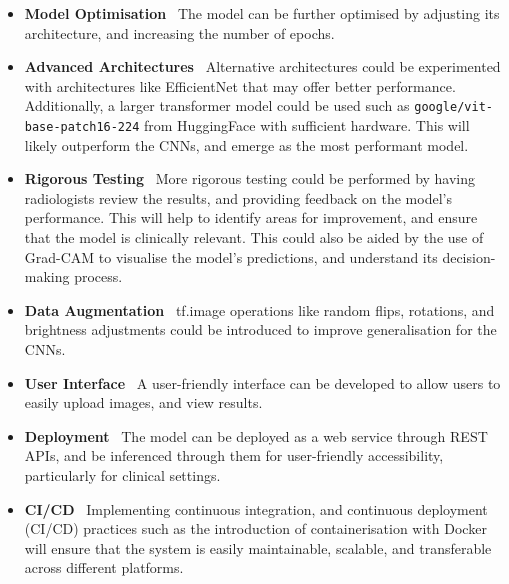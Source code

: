 \documentclass[../main]{subfiles}
\begin{document}
\begin{itemize}
	\item \textbf{Model Optimisation} \textemdash\ The model can be further optimised by adjusting its architecture, and increasing the number of epochs.
    \item \textbf{Advanced Architectures} \textemdash\ Alternative architectures could be experimented with architectures like EfficientNet that may offer better performance. Additionally, a larger transformer model could be used such as \texttt{google/vit-base-patch16-224} from HuggingFace with sufficient hardware. This will likely outperform the CNNs, and emerge as the most performant model.
    \item \textbf{Rigorous Testing} \textemdash\ More rigorous testing could be performed by having radiologists review the results, and providing feedback on the model's performance. This will help to identify areas for improvement, and ensure that the model is clinically relevant. This could also be aided by the use of Grad-CAM to visualise the model's predictions, and understand its decision-making process.
	\item \textbf{Data Augmentation} \textemdash\ tf.image operations like random flips, rotations, and brightness adjustments could be introduced to improve generalisation for the CNNs.
	\item \textbf{User Interface} \textemdash\ A user-friendly interface can be developed to allow users to easily upload images, and view results.
	\item \textbf{Deployment} \textemdash\ The model can be deployed as a web service through REST APIs, and be inferenced through them for user-friendly accessibility, particularly for clinical settings.
	\item \textbf{CI/CD} \textemdash\ Implementing continuous integration, and continuous deployment (CI/CD) practices such as the introduction of containerisation with Docker will ensure that the system is easily maintainable, scalable, and transferable across different platforms.
\end{itemize}
\end{document}
